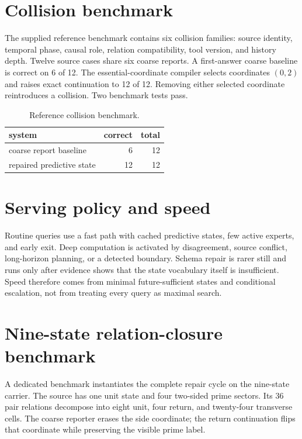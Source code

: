 \documentclass[11pt,a4paper]{article}
\begin{document}
\section{Collision benchmark}
The supplied reference benchmark contains six collision families: source identity, temporal phase, causal role, relation compatibility, tool version, and history depth. Twelve source cases share six coarse reports. A first-answer coarse baseline is correct on 6 of 12. The essential-coordinate compiler selects coordinates $(0,2)$ and raises exact continuation to 12 of 12. Removing either selected coordinate reintroduces a collision. Two benchmark tests pass.

\begin{table}[H]\centering
\caption{Reference collision benchmark.}
\begin{tabular}{lrr}
\toprule
system & correct & total\\\midrule
coarse report baseline & 6 & 12\\
repaired predictive state & 12 & 12\\
\bottomrule
\end{tabular}
\end{table}

\section{Serving policy and speed}
Routine queries use a fast path with cached predictive states, few active experts, and early exit. Deep computation is activated by disagreement, source conflict, long-horizon planning, or a detected boundary. Schema repair is rarer still and runs only after evidence shows that the state vocabulary itself is insufficient. Speed therefore comes from minimal future-sufficient states and conditional escalation, not from treating every query as maximal search.

\section{Nine-state relation-closure benchmark}
A dedicated benchmark instantiates the complete repair cycle on the nine-state carrier. The source has one unit state and four two-sided prime sectors. Its 36 pair relations decompose into eight unit, four return, and twenty-four transverse cells. The coarse reporter erases the side coordinate; the return continuation flips that coordinate while preserving the visible prime label.
\end{document}
